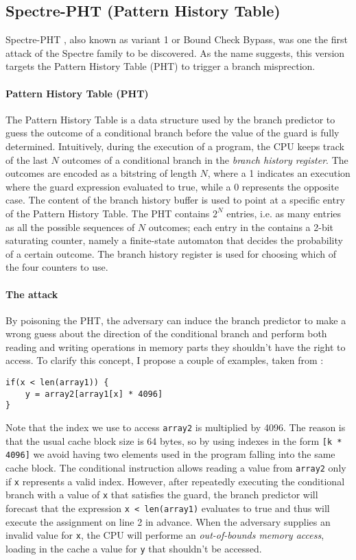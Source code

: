 \documentclass[12pt,a4paper]{book}
\theoremstyle{definition}
\begin{document}
	\subsection{Spectre-PHT (Pattern History Table)}
	Spectre-PHT \cite{Kocher2019}\cite{Canella2019}\cite{Evtyushkin2018}, also known as variant 1 or Bound Check Bypass, was one the first attack of the Spectre family to be discovered. As the name suggests, this version targets the Pattern History Table (PHT) to trigger a branch misprection.
	\paragraph{Pattern History Table (PHT)} The Pattern History Table \cite{Fog2021} is a data structure used by the branch predictor to guess the outcome of a conditional branch before the value of the guard is fully determined. Intuitively, during the execution of a program, the CPU keeps track of the last $N$ outcomes of a conditional branch in the \textit{branch history register}. The outcomes are encoded as a bitstring of length $N$, where a 1 indicates an execution where the guard expression evaluated to true, while a 0 represents the opposite case. The content of the branch history buffer is used to point at a specific entry of the Pattern History Table. The PHT contains $2^N$ entries, i.e. as many entries as all the possible sequences of $N$ outcomes; each entry in
	the contains a 2-bit saturating counter, namely a finite-state automaton that decides the probability of a certain outcome. The branch history register is used for choosing which of the four counters to use.
	
	\paragraph{The attack} By poisoning the PHT, the adversary can induce the branch predictor to make a wrong guess about the direction of the conditional branch and perform both reading and writing operations in memory parts they shouldn't have the right to access. To clarify this concept, I propose a couple of examples, taken from \cite{Canella2019}:
	\begin{lstlisting}
if(x < len(array1)) {
	y = array2[array1[x] * 4096]
}
	\end{lstlisting}
	Note that the index we use to access \texttt{array2} is multiplied by 4096. The reason is that the usual cache block size is 64 bytes, so by using indexes in the form \texttt{[k * 4096]} we avoid having two elements used in the program falling into the same cache block.
	The conditional instruction allows reading a value from \texttt{array2} only if \texttt{x} represents a valid index. However, after repeatedly executing the conditional branch with a value of \texttt{x} that satisfies the guard, the branch predictor will forecast that the expression \texttt{x < len(array1)} evaluates to true and thus will execute the assignment on line 2 in advance. When the adversary supplies an invalid value for \texttt{x}, the CPU will performe an \textit{out-of-bounds memory access}, loading in the cache a value for \texttt{y} that shouldn't be accessed.
	
\end{document}
